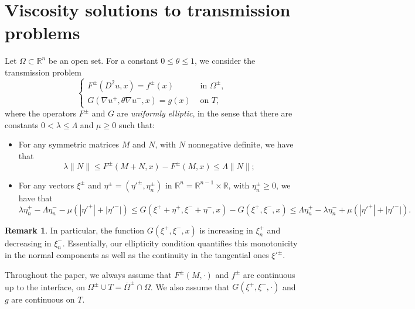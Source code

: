 \documentclass[letter,11pt]{amsart}
\newcommand{\R}{\mathbb{R}}
\theoremstyle{definition}
\newtheorem{rem}[thm]{Remark}
\numberwithin{equation}{section}
\begin{document}
\medskip


\section{Viscosity solutions to transmission problems}
\label{sec:visc}


Let $\Omega \subset \R^n$ be an open set.
For a constant $0 \leq \theta \leq 1$, we consider the transmission problem
\begin{equation}
\label{eq:nl}
\begin{cases}
F^{\pm} (D^2 u, x) = f^{\pm}(x) & \text{ in } 
\Omega^{\pm},\\
G(\nabla u^{+}, \theta \nabla u^{-}, x) = g(x)
 & \text{ on } T,
\end{cases}
\end{equation}
where the operators $F^{\pm}$ and $G$ are \emph{uniformly elliptic}, in the sense that there are constants $0 < \lambda \leq \Lambda$ and $\mu \geq 0$ such that:
\begin{itemize}
\item For any symmetric matrices $M$ and $N$, with $N$ nonnegative definite, we have that
\[ 
\lambda \|N\| \leq F^{\pm}(M + N,x) - F^{\pm}(M,x) \leq \Lambda \|N\|;
\]
\item
For any vectors $\xi^{\pm}$ and $\eta^{\pm} = (\eta'^{\pm}, \eta_n^{\pm})$ in $\R^{n} = \R^{n-1} \times \R$, with $\eta_n^{\pm} \geq 0$, we have that
\[
\lambda \eta^{+}_n - \Lambda \eta^{-}_n 
- \mu (|\eta'^{+}| + |\eta'^{-}|)
\leq G(\xi^{+} + \eta^{+}, \xi^{-} + \eta^{-}, x) - G(\xi^{+}, \xi^{-}, x) \leq \Lambda \eta^{+}_n - \lambda \eta^{-}_n 
+ \mu( |\eta'^{+}| + |\eta'^{-}|).
\]
\end{itemize}

\medskip

\begin{rem}
In particular, the function $G(\xi^{+}, \xi^{-}, x)$ is increasing in $\xi_n^{+}$ and decreasing in $\xi_n^{-}$.
Essentially, our ellipticity condition quantifies this monotonicity in the normal components as well as the continuity in the tangential ones $\xi'^{\pm}$.
\end{rem}

\medskip

Throughout the paper, we always assume that $F^{\pm}(M, \cdot)$ and $f^{\pm}$ are continuous up to the interface, on $\Omega^{\pm} \cup T = \overline{\Omega}^{\pm} \cap \Omega$.
We also assume that $G(\xi^{+}, \xi^{-}, \cdot)$ and $g$ are continuous on $T$.
\end{document}
